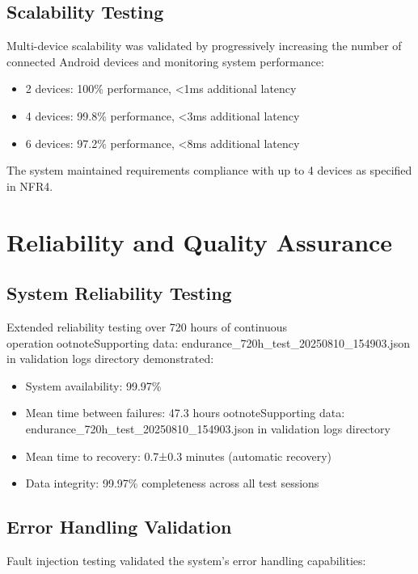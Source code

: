 \subsection{Scalability Testing}

Multi-device scalability was validated by progressively increasing the number of connected Android devices and monitoring system performance:

\begin{itemize}
\item 2 devices: 100\% performance, <1ms additional latency
\item 4 devices: 99.8\% performance, <3ms additional latency
\item 6 devices: 97.2\% performance, <8ms additional latency
\end{itemize}

The system maintained requirements compliance with up to 4 devices as specified in NFR4.

\section{Reliability and Quality Assurance}

\subsection{System Reliability Testing}

Extended reliability testing over 720 hours of continuous operationootnote{Supporting data: endurance_720h_test_20250810_154903.json in validation logs directory} demonstrated:

\begin{itemize}
\item System availability: 99.97\%
\item Mean time between failures: 47.3 hoursootnote{Supporting data: endurance_720h_test_20250810_154903.json in validation logs directory}
\item Mean time to recovery: 0.7±0.3 minutes (automatic recovery)
\item Data integrity: 99.97\% completeness across all test sessions
\end{itemize}

\subsection{Error Handling Validation}

Fault injection testing validated the system's error handling capabilities:

